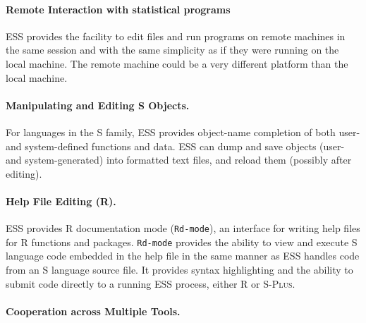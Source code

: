 \documentclass{article}
\newcommand*{\Splus}{\textsc{S-Plus}}
\newcommand{\stexttt}[1]{{\small\texttt{#1}}}
\begin{document}
\paragraph{Remote Interaction with statistical programs}%
ESS provides the facility to edit files and run programs on remote
machines in the same session and with the same simplicity as if they
were running on the local machine.  The remote machine could be a very
different platform than the local machine.

\paragraph{Manipulating and Editing S Objects.}
For languages in the S family, ESS provides object-name completion of
both user- and system-defined functions and data.  ESS can dump and
save objects (user- and system-generated) into formatted text files,
and reload them (possibly after editing).

\paragraph{Help File Editing (R).}
ESS provides R documentation mode (\stexttt{Rd-mode}), an interface
for writing help files for R functions and packages.
\stexttt{Rd-mode} provides the ability to view and execute S language
code embedded in the help file in the same manner as ESS handles code
from an S language source file.  It provides syntax highlighting and
the ability to submit code directly to a running ESS process, either R
or \Splus.



\paragraph{Cooperation across Multiple Tools.}
\label{sec:multiple-tools}
\end{document}

